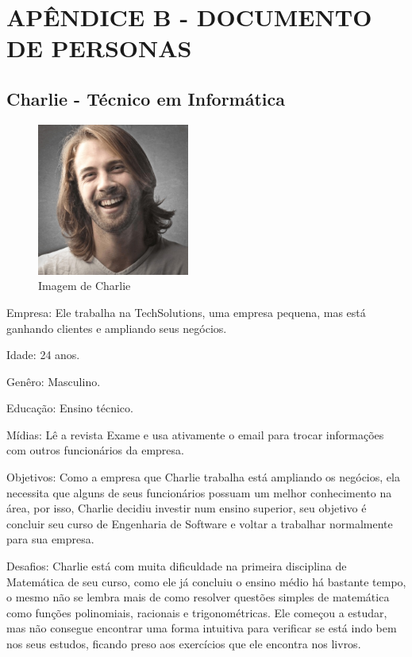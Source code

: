 \chapter*{APÊNDICE B - DOCUMENTO DE PERSONAS}\label{apendice_personas}

\section{Charlie - Técnico em Informática}

\begin{figure}[H]
\centering
\includegraphics[width=5cm]{figuras/personas/figura_persona_1}
\caption{Imagem de Charlie}
\label{figura_persona_1}
\end{figure}


Empresa: Ele trabalha na TechSolutions, uma empresa pequena, mas está ganhando
clientes e ampliando seus negócios.

Idade: 24 anos.

Genêro: Masculino.

Educação: Ensino técnico.

Mídias: Lê a revista Exame e usa ativamente o email para trocar informações com 
outros funcionários da empresa.

Objetivos: Como a empresa que Charlie trabalha está ampliando os negócios, ela
necessita que alguns de seus funcionários possuam um melhor conhecimento na 
área, por isso, Charlie decidiu investir num ensino superior, seu objetivo é 
concluir seu curso de Engenharia de Software e voltar a trabalhar normalmente 
para sua empresa.

Desafios: Charlie está com muita dificuldade na primeira disciplina de 
Matemática de seu curso, como ele já concluiu o ensino médio há bastante tempo, 
o mesmo não se lembra mais de como resolver questões simples de matemática como 
funções polinomiais, racionais e trigonométricas. Ele começou a estudar, mas 
não consegue encontrar uma forma intuitiva para verificar se está indo bem nos 
seus estudos, ficando preso aos exercícios que ele encontra nos livros.

